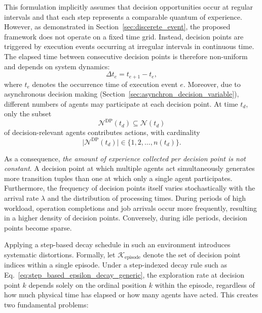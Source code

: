 This formulation implicitly assumes that decision opportunities occur at regular intervals and that each step represents a comparable quantum of experience. However, as demonstrated in Section~\ref{sec:discerete_event}, the proposed framework does not operate on a fixed time grid. Instead, decision points are triggered by execution events occurring at irregular intervals in continuous time. The elapsed time between consecutive decision points is therefore non-uniform and depends on system dynamics:
\begin{equation}
\Delta t_e = t_{e+1} - t_e,
\label{eq:variable_interarrival_time_recap}
\end{equation}
where $t_e$ denotes the occurrence time of execution event $e$. Moreover, due to asynchronous decision making (Section~\ref{sec:asynchron_decision_variable}), different numbers of agents may participate at each decision point. At time $t_d$, only the subset
\begin{equation}
\mathcal{N}^{\mathrm{DP}}(t_d) \subseteq \mathcal{N}(t_d)
\label{eq:decision_participation_recap}
\end{equation}
of decision-relevant agents contributes actions, with cardinality
\begin{equation}
\big|\mathcal{N}^{\mathrm{DP}}(t_d)\big| \in \{1, 2, \ldots, n(t_d)\}.
\label{eq:variable_decision_participation_size}
\end{equation}

As a consequence, \textit{the amount of experience collected per decision point is not constant}. A decision point at which multiple agents act simultaneously generates more transition tuples than one at which only a single agent participates. Furthermore, the frequency of decision points itself varies stochastically with the arrival rate $\lambda$ and the distribution of processing times. During periods of high workload, operation completions and job arrivals occur more frequently, resulting in a higher density of decision points. Conversely, during idle periods, decision points become sparse.

Applying a step-based decay schedule in such an environment introduces systematic distortions. Formally, let $\mathcal{K}_{\text{episode}}$ denote the set of decision point indices within a single episode. Under a step-indexed decay rule such as Eq.~\eqref{eq:step_based_epsilon_decay_generic}, the exploration rate at decision point $k$ depends solely on the ordinal position $k$ within the episode, regardless of how much physical time has elapsed or how many agents have acted. This creates two fundamental problems:

